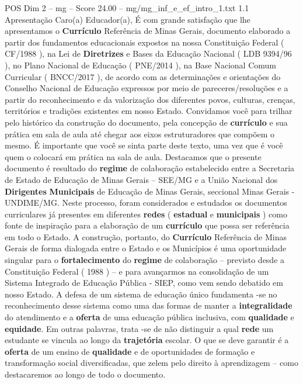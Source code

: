 \begin{textsample}{POS Dim 2 – mg – Score 24.00 – mg/mg\_inf\_e\_ef\_intro\_1.txt}  \label{ex:f2_pos_199}
1.1 Apresentação Caro(a) Educador(a), É com grande satisfação que lhe apresentamos o \textbf{Currículo} Referência de Minas Gerais, documento elaborado a partir dos fundamentos educacionais expostos na nossa Constituição Federal ( CF/1988 ), na Lei de \textbf{Diretrizes} e Bases da Educação Nacional ( LDB 9394/96 ), no Plano Nacional de Educação ( PNE/2014 ), na Base Nacional Comum Curricular ( BNCC/2017 ), de acordo com as determinações e orientações do Conselho Nacional de Educação expressos por meio de pareceres/resoluções e a partir do reconhecimento e da valorização dos diferentes povos, culturas, crenças, territórios e tradições existentes em nosso Estado.
Convidamos você para trilhar pelo histórico da construção do documento, pela concepção de \textbf{currículo} e sua prática em sala de aula até chegar aos eixos estruturadores que compõem o mesmo.
É importante que você se sinta parte deste texto, uma vez que é você quem o colocará em prática na sala de aula.
Destacamos que o presente documento é resultado do \textbf{regime} de colaboração estabelecido entre a Secretaria de Estado de Educação de Minas Gerais – SEE/MG e a União Nacional dos \textbf{Dirigentes} \textbf{Municipais} de Educação de Minas Gerais, seccional Minas Gerais - UNDIME/MG.
Neste processo, foram considerados e estudados os documentos curriculares já presentes em diferentes \textbf{redes} ( \textbf{estadual} e \textbf{municipais} ) como fonte de inspiração para a elaboração de um \textbf{currículo} que possa ser referência em todo o Estado.
A construção, portanto, do \textbf{Currículo} Referência de Minas Gerais de forma dialogada entre o Estado e os Municípios é uma oportunidade singular para o \textbf{fortalecimento} do \textbf{regime} de colaboração – previsto desde a Constituição Federal ( 1988 ) – e para avançarmos na consolidação de um Sistema Integrado de Educação Pública - SIEP, como vem sendo debatido em nosso Estado.
A defesa de um sistema de educação único fundamenta -se no reconhecimento desse sistema como uma das formas de manter a \textbf{integralidade} do atendimento e a \textbf{oferta} de uma educação pública inclusiva, com \textbf{qualidade} e \textbf{equidade}.
Em outras palavras, trata -se de não distinguir a qual \textbf{rede} um estudante se vincula ao longo da \textbf{trajetória} escolar.
O que se deve garantir é a \textbf{oferta} de um ensino de \textbf{qualidade} e de oportunidades de formação e transformação social diversificadas, que zelem pelo direito à aprendizagem – como destacaremos ao longo de todo o documento.

\end{textsample}
